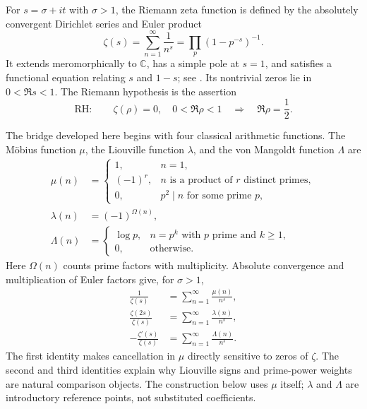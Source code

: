 \documentclass[11pt]{amsart}
\numberwithin{equation}{section}
\theoremstyle{plain}
\theoremstyle{definition}
\theoremstyle{remark}
\newcommand{\C}{\mathbb C}
\newcommand{\RH}{\mathrm{RH}}
\begin{document}
For $s=\sigma+it$ with $\sigma>1$, the Riemann zeta function is defined by
the absolutely convergent Dirichlet series and Euler product
\begin{equation}
\zeta(s)=\sum_{n=1}^{\infty}\frac1{n^s}
=\prod_p\left(1-p^{-s}\right)^{-1}.
\label{eq:zeta-series-product}
\end{equation}
It extends meromorphically to $\C$, has a simple pole at $s=1$, and satisfies
a functional equation relating $s$ and $1-s$; see
\cite{Titchmarsh1986,Apostol1976}.  Its nontrivial zeros lie in
$0<\Re s<1$.  The Riemann hypothesis is the assertion
\begin{equation}
\RH:\qquad \zeta(\rho)=0,\quad 0<\Re\rho<1
\quad\Longrightarrow\quad \Re\rho=\frac12.
\label{eq:RH-statement}
\end{equation}

The bridge developed here begins with four classical arithmetic functions.
The M\"obius function $\mu$, the Liouville function $\lambda$, and the von
Mangoldt function $\Lambda$ are
\begin{align}
\mu(n)&=
\begin{cases}
1,&n=1,\\
(-1)^r,&n\text{ is a product of }r\text{ distinct primes},\\
0,&p^2\mid n\text{ for some prime }p,
\end{cases}
\label{eq:mobius-definition}\\
\lambda(n)&=(-1)^{\Omega(n)},
\label{eq:liouville-definition}\\
\Lambda(n)&=
\begin{cases}
\log p,&n=p^k\text{ with }p\text{ prime and }k\ge1,\\
0,&\text{otherwise}.
\end{cases}
\label{eq:mangoldt-definition}
\end{align}
Here $\Omega(n)$ counts prime factors with multiplicity.  Absolute convergence
and multiplication of Euler factors give, for $\sigma>1$,
\begin{align}
\frac1{\zeta(s)}&=\sum_{n=1}^{\infty}\frac{\mu(n)}{n^s},
\label{eq:mobius-zeta}\\
\frac{\zeta(2s)}{\zeta(s)}&=
\sum_{n=1}^{\infty}\frac{\lambda(n)}{n^s},
\label{eq:liouville-zeta}\\
-\frac{\zeta'(s)}{\zeta(s)}&=
\sum_{n=1}^{\infty}\frac{\Lambda(n)}{n^s}.
\label{eq:mangoldt-zeta}
\end{align}
The first identity makes cancellation in $\mu$ directly sensitive to zeros of
$\zeta$.  The second and third identities explain why Liouville signs and
prime-power weights are natural comparison objects.  The construction below
uses $\mu$ itself; $\lambda$ and $\Lambda$ are introductory reference points,
not substituted coefficients.
\end{document}
